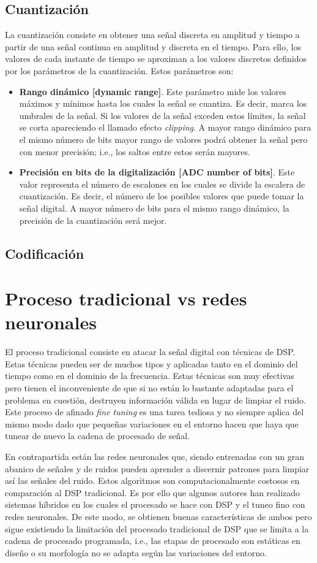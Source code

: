 \subsection{Cuantización}
La cuantización consiste en obtener una señal discreta en amplitud y tiempo a partir de una señal continua en amplitud y discreta en el tiempo. Para ello, los valores de cada instante de tiempo se aproximan a los valores discretos definidos por los parámetros de la cuantización. Estos parámetros son:
\begin{itemize}
	\item \textbf{Rango dinámico [dynamic range]}. Este parámetro mide los valores máximos y mínimos hasta los cuales la señal se cuantiza. Es decir, marca los umbrales de la señal. Si los valores de la señal exceden estos límites, la señal se corta apareciendo el llamado efecto \textit{clipping}. A mayor rango dinámico para el mismo número de bits mayor rango de valores podrá obtener la señal pero con menor precisión; i.e., los saltos entre estos serán mayores.
	\item \textbf{Precisión en bits de la digitalización [\gls{ADC} number of bits]}. Este valor representa el número de escalones en los cuales se divide la escalera de cuantización. Es decir, el número de los posibles valores que puede tomar la señal digital. A mayor número de bits para el mismo rango dinámico, la precisión de la cuantización será mejor.
\end{itemize}

\subsection{Codificación}

\section{Proceso tradicional vs redes neuronales}
El proceso tradicional consiste en atacar la señal digital con técnicas de \gls{DSP}. Estas técnicas pueden ser de muchos tipos y aplicadas tanto en el dominio del tiempo como en el dominio de la frecuencia. Estas técnicas son muy efectivas pero tienen el inconveniente de que si no están lo bastante adaptadas para el problema en cuestión, destruyen información válida en lugar de limpiar el ruido. Este proceso de afinado \textit{fine tuning} es una tarea tediosa y no siempre aplica del mismo modo dado que pequeñas variaciones en el entorno hacen que haya que tunear de nuevo la cadena de procesado de señal.

En contrapartida están las redes neuronales que, siendo entrenadas con un gran abanico de señales y de ruidos pueden aprender a discernir patrones para limpiar así las señales del ruido. Estos algoritmos son computacionalmente costosos en comparación al \gls{DSP} tradicional. Es por ello que algunos autores han realizado sistemas híbridos en los cuales el procesado se hace con \gls{DSP} y el tuneo fino con redes neuronales. De este modo, se obtienen buenas características de ambos pero sigue existiendo la limitación del procesado tradicional de \gls{DSP} que se limita a la cadena de procesado programada, i.e., las etapas de procesado son estáticas en diseño o su morfología no se adapta según las variaciones del entorno.
